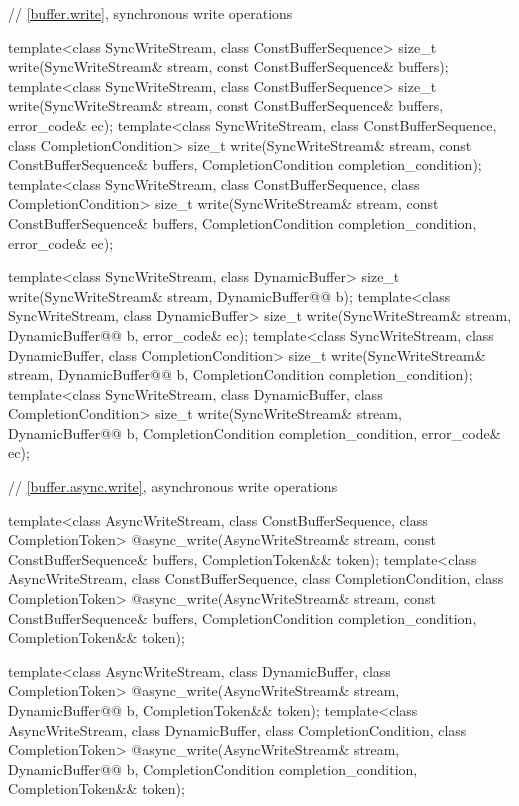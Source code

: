 \begin{codeblock}
{  // \ref{buffer.write}, synchronous write operations

  template<class SyncWriteStream, class ConstBufferSequence>
    size_t write(SyncWriteStream& stream,
                 const ConstBufferSequence& buffers);
  template<class SyncWriteStream, class ConstBufferSequence>
    size_t write(SyncWriteStream& stream,
                 const ConstBufferSequence& buffers, error_code& ec);
  template<class SyncWriteStream, class ConstBufferSequence,
    class CompletionCondition>
      size_t write(SyncWriteStream& stream,
                   const ConstBufferSequence& buffers,
                   CompletionCondition completion_condition);
  template<class SyncWriteStream, class ConstBufferSequence,
    class CompletionCondition>
      size_t write(SyncWriteStream& stream,
                   const ConstBufferSequence& buffers,
                   CompletionCondition completion_condition,
                   error_code& ec);

  template<class SyncWriteStream, class DynamicBuffer>
    size_t write(SyncWriteStream& stream, DynamicBuffer@\removedcode{\&\&}@ b);
  template<class SyncWriteStream, class DynamicBuffer>
    size_t write(SyncWriteStream& stream, DynamicBuffer@\removedcode{\&\&}@ b, error_code& ec);
  template<class SyncWriteStream, class DynamicBuffer, class CompletionCondition>
    size_t write(SyncWriteStream& stream, DynamicBuffer@\removedcode{\&\&}@ b,
                 CompletionCondition completion_condition);
  template<class SyncWriteStream, class DynamicBuffer, class CompletionCondition>
    size_t write(SyncWriteStream& stream, DynamicBuffer@\removedcode{\&\&}@ b,
                 CompletionCondition completion_condition, error_code& ec);

  // \ref{buffer.async.write}, asynchronous write operations

  template<class AsyncWriteStream, class ConstBufferSequence,
    class CompletionToken>
      @\DEDUCED@ async_write(AsyncWriteStream& stream,
                          const ConstBufferSequence& buffers,
                          CompletionToken&& token);
  template<class AsyncWriteStream, class ConstBufferSequence,
    class CompletionCondition, class CompletionToken>
      @\DEDUCED@ async_write(AsyncWriteStream& stream,
                          const ConstBufferSequence& buffers,
                          CompletionCondition completion_condition,
                          CompletionToken&& token);

  template<class AsyncWriteStream, class DynamicBuffer, class CompletionToken>
    @\DEDUCED@ async_write(AsyncWriteStream& stream,
                     DynamicBuffer@\removedcode{\&\&}@ b, CompletionToken&& token);
  template<class AsyncWriteStream, class DynamicBuffer,
    class CompletionCondition, class CompletionToken>
      @\DEDUCED@ async_write(AsyncWriteStream& stream,
                          DynamicBuffer@\removedcode{\&\&}@ b,
                          CompletionCondition completion_condition,
                          CompletionToken&& token);

}
\end{codeblock}
